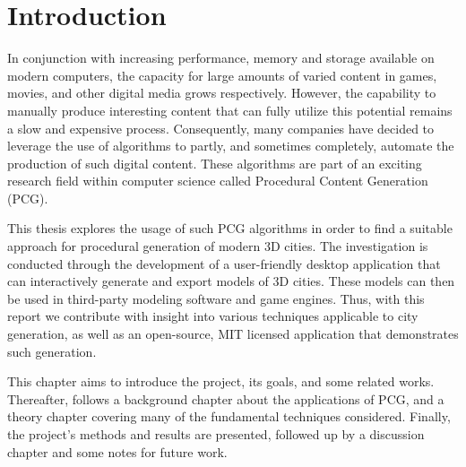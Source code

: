 \chapter{Introduction}



In conjunction with increasing performance, memory and storage available on modern computers, the capacity for large amounts of varied content in games, movies, and other digital media grows respectively.
However, the capability to manually produce interesting content that can fully utilize this potential remains a slow and expensive process.
Consequently, many companies have decided to leverage the use of algorithms to partly, and sometimes completely, automate the production of such digital content.
These algorithms are part of an exciting research field within computer science called Procedural Content Generation (PCG).

This thesis explores the usage of such PCG algorithms in order to find a suitable approach for procedural generation of modern 3D cities.
The investigation is conducted through the development of a user-friendly desktop application that can interactively generate and export models of 3D cities.
These models can then be used in third-party modeling software and game engines.
Thus, with this report we contribute with insight into various techniques applicable to city generation, as well as an open-source, MIT licensed application that demonstrates such generation.

This chapter aims to introduce the project, its goals, and some related works.
Thereafter, follows a background chapter about the applications of PCG, and a theory chapter covering many of the fundamental techniques considered.
Finally, the project's methods and results are presented, followed up by a discussion chapter and some notes for future work.

\newpage




